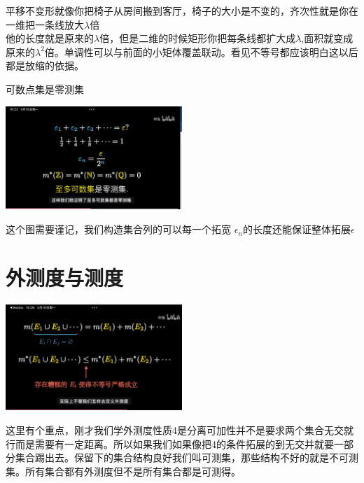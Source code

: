 \documentclass[lang=cn,10pt]{elegantbook}
\begin{document}
平移不变形就像你把椅子从房间搬到客厅，椅子的大小是不变的，齐次性就是你在一维把一条线放大$\lambda$倍\\
他的长度就是原来的$\lambda$倍，但是二维的时候矩形你把每条线都扩大成$\lambda$,面积就变成原来的$\lambda^2$倍。单调性可以与前面的小矩体覆盖联动。看见不等号都应该明白这以后都是放缩的依据。
\begin{definition}[零测集]
    可数点集是零测集
\end{definition}
\begin{center}
    

\includegraphics[width=0.5\textwidth]{零测集image.png}
\end{center}
这个图需要谨记，我们构造集合列的可以每一个拓宽 $\epsilon_n$的长度还能保证整体拓展$\epsilon$

\section{外测度与测度}
\begin{center}
    

\includegraphics[width=0.5\textwidth]{image/pdf/测度与外测度image.png}
\end{center}
这里有个重点，刚才我们学外测度性质4是分离可加性并不是要求两个集合无交就行而是需要有一定距离。所以如果我们如果像把4的条件拓展的到无交并就要一部分集合踢出去。保留下的集合结构良好我们叫可测集，那些结构不好的就是不可测集。所有集合都有外测度但不是所有集合都是可测得。
\end{document}
